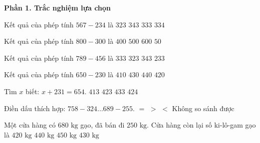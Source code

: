 \textbf{Phần 1. Trắc nghiệm lựa chọn}

\begin{ex} %
Kết quả của phép tính $567 - 234$ là
\choice
{$323$}
{$343$}
{\True $333$}
{$334$}
\end{ex}

\begin{ex} %
Kết quả của phép tính $800 - 300$ là
\choice
{$400$}
{\True $500$}
{$600$}
{$50$}
\end{ex}

\begin{ex} %
Kết quả của phép tính $789 - 456$ là
\choice
{\True $333$}
{$323$}
{$343$}
{$233$}
\end{ex}

\begin{ex} %
Kết quả của phép tính $650 - 230$ là
\choice
{$410$}
{$430$}
{$440$}
{\True $420$}
\end{ex}

\begin{ex} %
Tìm $x$ biết: $x + 231 = 654$.
\choice
{$413$}
{\True $423$}
{$433$}
{$424$}
\end{ex}

\begin{ex} %
Điền dấu thích hợp: $758 - 324 \dots 689 - 255$.
\choice
{\True $=$}
{$>$}
{$<$}
{Không so sánh được}
\end{ex}

\begin{ex} %
Một cửa hàng có $680\text{ kg}$ gạo, đã bán đi $250\text{ kg}$. Cửa hàng còn lại số ki-lô-gam gạo là
\choice
{$420\text{ kg}$}
{$440\text{ kg}$}
{$450\text{ kg}$}
{\True $430\text{ kg}$}
\end{ex}

